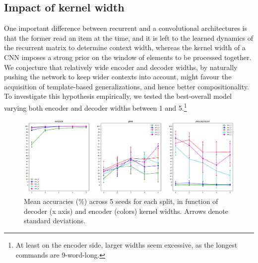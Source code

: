 

\subsection{Impact of kernel width}
\label{subsec:exp2}

One important difference between recurrent and a convolutional
architectures is that the former read an item at the time, and it is
left to the learned dynamics of the recurrent matrix to determine
context width, whereas the kernel width of a CNN imposes a strong
prior on the window of elements to be processed together. We
conjecture that relatively wide encoder and decoder widths, by
naturally pushing the network to keep wider contexts into account,
might favour the acquisition of template-based generalizations, and
hence better compositionality. To investigate this hypothesis
empirically, we tested the best-overall model varying both encoder and
decoder widths between 1 and 5.\footnote{At least on the encoder side,
  larger widths seem excessive, as the longest commands are
  9-word-long.}


\begin{figure}[tb]
    \centering
    \includegraphics[width=\textwidth,keepaspectratio]{figures/kernel_exp.png}
    \caption{Mean accuracies (\%) across 5 seeds for each split, in function of decoder (x axis) and encoder (colors) kernel widths. Arrows denote standard deviations.
    }
    \label{fig:kernel_exp}
\end{figure}


